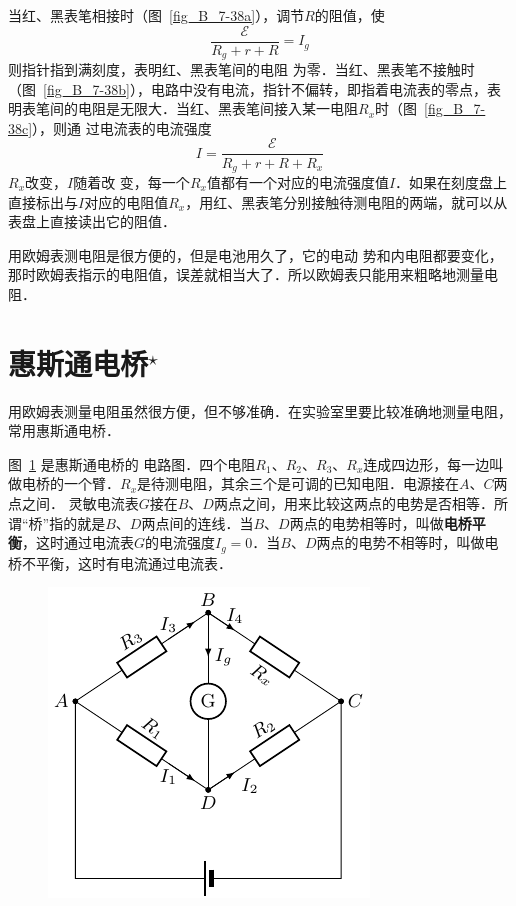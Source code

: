 当红、黑表笔相接时（图~\ref{fig_B_7-38a}），调节$R$的阻值，使
\[\frac{\mathcal{E}}{R_g+r+R}=I_g\]
则指针指到满刻度，表明红、黑表笔间的电阻
为零．当红、黑表笔不接触时（图~\ref{fig_B_7-38b}），电路中没有电流，指针不偏转，即指着电流表的零点，表明表笔间的电阻是无限大．当红、黑表笔间接入某一电阻$R_x$时（图~\ref{fig_B_7-38c}），则通
过电流表的电流强度
\[I=\frac{\mathcal{E}}{R_g+r+R+R_x}\]
$R_x$改变，$I$随着改
变，每一个$R_x$值都有一个对应的电流强度值$I$．如果在刻度盘上直接标出与$I$对应的电阻值$R_x$，用红、黑表笔分别接触待测电阻的两端，就可以从表盘上直接读出它的阻值．

用欧姆表测电阻是很方便的，但是电池用久了，它的电动
势和内电阻都要变化，那时欧姆表指示的电阻值，误差就相当大了．所以欧姆表只能用来粗略地测量电阻．



\section{惠斯通电桥$^\star$}
用欧姆表测量电阻虽然很方便，但不够准确．在实验室里要比较准确地测量电阻，常用惠斯通电桥．


图~\ref{fig_B_7-39} 是惠斯通电桥的
电路图．四个电阻$R_1$、$R_2$、$R_3$、$R_x$连成四边形，每一边叫做电桥的一个臂．$R_x$是待测电阻，其余三个是可调的已知电阻．电源接在$A$、$C$两点之间．
灵敏电流表$G$接在$B$、$D$两点之间，用来比较这两点的电势是否相等．所谓“桥”指的就是$B$、$D$两点间的连线．当$B$、$D$两点的电势相等时，叫做\textbf{电桥平衡}，这时通过电流表$G$的电流强度$I_g=0$．当$B$、$D$两点的电势不相等时，叫做电桥不平衡，这时有电流通过电流表．

\begin{figure}[htbp]
	\centering
	\includegraphics{fig/B/7-39.pdf}
	\caption{}\label{fig_B_7-39}
\end{figure}

